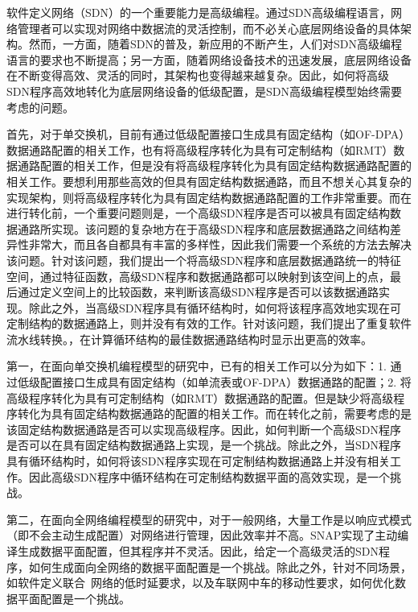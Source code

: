 \documentclass{ctexart}
\begin{document}
软件定义网络（SDN）的一个重要能力是高级编程。通过SDN高级编程语言，网络管理者可以实现对网络中数据流的灵活控制，而不必关心底层网络设备的具体架构。然而，一方面，随着SDN的普及，新应用的不断产生，人们对SDN高级编程语言的要求也不断提高；另一方面，随着网络设备技术的迅速发展，底层网络设备在不断变得高效、灵活的同时，其架构也变得越来越复杂。因此，如何将高级SDN程序高效地转化为底层网络设备的低级配置，是SDN高级编程模型始终需要考虑的问题。

首先，对于单交换机，目前有通过低级配置接口生成具有固定结构（如OF-DPA）数据通路配置的相关工作，也有将高级程序转化为具有可定制结构（如RMT）数据通路配置的相关工作，但是没有将高级程序转化为具有固定结构数据通路配置的相关工作。要想利用那些高效的但具有固定结构数据通路，而且不想关心其复杂的实现架构，则将高级程序转化为具有固定结构数据通路配置的工作非常重要。而在进行转化前，一个重要问题则是，一个高级SDN程序是否可以被具有固定结构数据通路所实现。该问题的复杂地方在于高级SDN程序和底层数据通路之间结构差异性非常大，而且各自都具有丰富的多样性，因此我们需要一个系统的方法去解决该问题。针对该问题，我们提出一个将高级SDN程序和底层数据通路统一的特征空间，通过特征函数，高级SDN程序和数据通路都可以映射到该空间上的点，最后通过定义空间上的比较函数，来判断该高级SDN程序是否可以该数据通路实现。除此之外，当高级SDN程序具有循环结构时，如何将该程序高效地实现在可定制结构的数据通路上，则并没有有效的工作。针对该问题，我们提出了重复软件流水线转换。，在计算循环结构的最佳数据通路结构时显示出更高的效率。


第一，在面向单交换机编程模型的研究中，已有的相关工作可以分为如下：1. 通过低级配置接口生成具有固定结构（如单流表或OF-DPA）数据通路的配置；2. 将高级程序转化为具有可定制结构（如RMT）数据通路的配置。但是缺少将高级程序转化为具有固定结构数据通路的配置的相关工作。而在转化之前，需要考虑的是该固定结构数据通路是否可以实现高级程序。因此，如何判断一个高级SDN程序是否可以在具有固定结构数据通路上实现，是一个挑战。除此之外，当SDN程序具有循环结构时，如何将该SDN程序实现在可定制结构数据通路上并没有相关工作。因此高级SDN程序中循环结构在可定制结构数据平面的高效实现，是一个挑战。

第二，在面向全网络编程模型的研究中，对于一般网络，大量工作是以响应式模式（即不会主动生成配置）对网络进行管理，因此效率并不高。SNAP实现了主动编译生成数据平面配置，但其程序并不灵活。因此，给定一个高级灵活的SDN程序，如何生成面向全网络的数据平面配置是一个挑战。除此之外，针对不同场景，如软件定义联合~\cite{mishra2017comparing}网络的低时延要求，以及车联网中车的移动性要求，如何优化数据平面配置是一个挑战。
\end{document}
